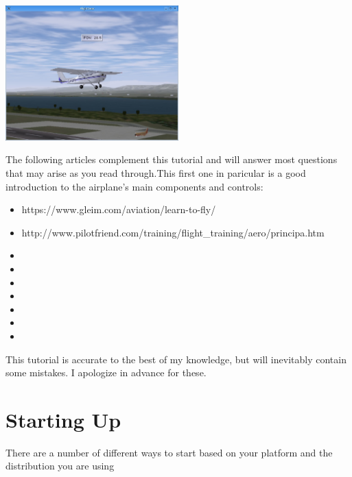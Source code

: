 \begin{center}
\includegraphics[width=0.5\textwidth]{img/tut_1}
\end{center}
    
The following articles complement this tutorial and will answer most questions
that may arise as you read through.This first one in paricular is a good
introduction to the airplane's main components and controls:
\begin{itemize}
	\item {}    {https://www.gleim.com/aviation/learn-to-fly/}
	\item {}    {http://www.pilotfriend.com/training/flight_training/aero/principa.htm}
	\item {}
	\item {}
	\item {}
	\item {}
	\item {}
	\item {}
	\item {}
\end{itemize}

This tutorial is accurate to the best of my knowledge, but will inevitably
contain some mistakes. I apologize in advance for these.

\section{Starting Up}

There are a number of different ways to start \FlightGear{} based on your
platform and the distribution you are using

